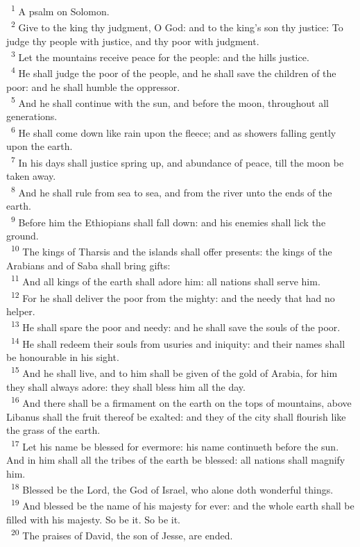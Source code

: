 \documentclass[a5paper,12pt]{article}
\begin{document}
\begin{multicols*}{2}
~\textsuperscript{1} A psalm on Solomon.\\
~\textsuperscript{2} Give to the king thy judgment, O God: and to the king's son thy justice: To judge thy people with justice, and thy poor with judgment.\\
~\textsuperscript{3} Let the mountains receive peace for the people: and the hills justice.\\
~\textsuperscript{4} He shall judge the poor of the people, and he shall save the children of the poor: and he shall humble the oppressor.\\
~\textsuperscript{5} And he shall continue with the sun, and before the moon, throughout all generations.\\
~\textsuperscript{6} He shall come down like rain upon the fleece; and as showers falling gently upon the earth.\\
~\textsuperscript{7} In his days shall justice spring up, and abundance of peace, till the moon be taken away.\\
~\textsuperscript{8} And he shall rule from sea to sea, and from the river unto the ends of the earth.\\
~\textsuperscript{9} Before him the Ethiopians shall fall down: and his enemies shall lick the ground.\\
~\textsuperscript{10} The kings of Tharsis and the islands shall offer presents: the kings of the Arabians and of Saba shall bring gifts:\\
~\textsuperscript{11} And all kings of the earth shall adore him: all nations shall serve him.\\
~\textsuperscript{12} For he shall deliver the poor from the mighty: and the needy that had no helper.\\
~\textsuperscript{13} He shall spare the poor and needy: and he shall save the souls of the poor.\\
~\textsuperscript{14} He shall redeem their souls from usuries and iniquity: and their names shall be honourable in his sight.\\
~\textsuperscript{15} And he shall live, and to him shall be given of the gold of Arabia, for him they shall always adore: they shall bless him all the day.\\
~\textsuperscript{16} And there shall be a firmament on the earth on the tops of mountains, above Libanus shall the fruit thereof be exalted: and they of the city shall flourish like the grass of the earth.\\
~\textsuperscript{17} Let his name be blessed for evermore: his name continueth before the sun. And in him shall all the tribes of the earth be blessed: all nations shall magnify him.\\
~\textsuperscript{18} Blessed be the Lord, the God of Israel, who alone doth wonderful things.\\
~\textsuperscript{19} And blessed be the name of his majesty for ever: and the whole earth shall be filled with his majesty. So be it. So be it.\\
~\textsuperscript{20} The praises of David, the son of Jesse, are ended.\\


\end{multicols*}
\end{document}
